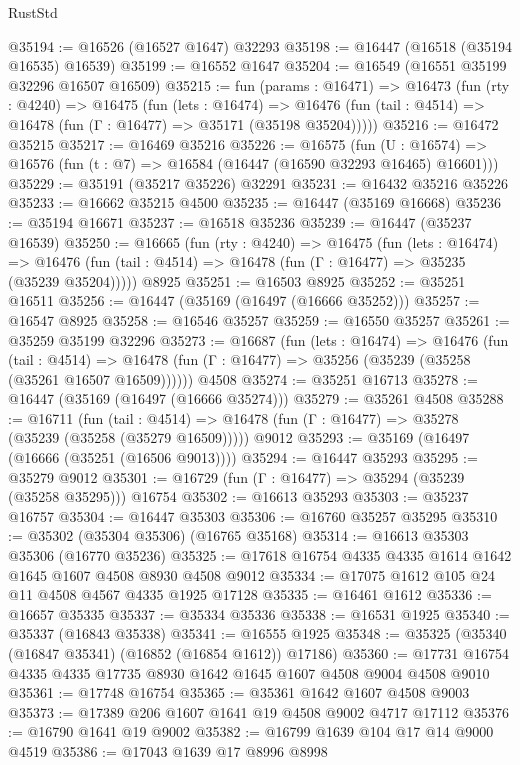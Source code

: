 \begin{lexlean}{RustStd}
\begin{coremodule}
@35194 := @16526 (@16527 @1647) @32293
@35198 := @16447 (@16518 (@35194 @16535) @16539)
@35199 := @16552 @1647
@35204 := @16549 (@16551 @35199 @32296 @16507 @16509)
@35215 := fun (params : @16471) =>
  @16473
    (fun (rty : @4240) =>
    @16475
      (fun (lets : @16474) =>
      @16476 (fun (tail : @4514) => @16478 (fun (Γ : @16477) => @35171 (@35198 @35204)))))
@35216 := @16472 @35215
@35217 := @16469 @35216
@35226 := @16575
    (fun (U : @16574) => @16576 (fun (t : @7) => @16584 (@16447 (@16590 @32293 @16465) @16601)))
@35229 := @35191 (@35217 @35226) @32291
@35231 := @16432 @35216 @35226
@35233 := @16662 @35215 @4500
@35235 := @16447 (@35169 @16668)
@35236 := @35194 @16671
@35237 := @16518 @35236
@35239 := @16447 (@35237 @16539)
@35250 := @16665
    (fun (rty : @4240) =>
    @16475
      (fun (lets : @16474) =>
      @16476 (fun (tail : @4514) => @16478 (fun (Γ : @16477) => @35235 (@35239 @35204)))))
    @8925
@35251 := @16503 @8925
@35252 := @35251 @16511
@35256 := @16447 (@35169 (@16497 (@16666 @35252)))
@35257 := @16547 @8925
@35258 := @16546 @35257
@35259 := @16550 @35257
@35261 := @35259 @35199 @32296
@35273 := @16687
    (fun (lets : @16474) =>
    @16476
      (fun (tail : @4514) =>
      @16478 (fun (Γ : @16477) => @35256 (@35239 (@35258 (@35261 @16507 @16509))))))
    @4508
@35274 := @35251 @16713
@35278 := @16447 (@35169 (@16497 (@16666 @35274)))
@35279 := @35261 @4508
@35288 := @16711
    (fun (tail : @4514) => @16478 (fun (Γ : @16477) => @35278 (@35239 (@35258 (@35279 @16509)))))
    @9012
@35293 := @35169 (@16497 (@16666 (@35251 (@16506 @9013))))
@35294 := @16447 @35293
@35295 := @35279 @9012
@35301 := @16729 (fun (Γ : @16477) => @35294 (@35239 (@35258 @35295))) @16754
@35302 := @16613 @35293
@35303 := @35237 @16757
@35304 := @16447 @35303
@35306 := @16760 @35257 @35295
@35310 := @35302 (@35304 @35306) (@16765 @35168)
@35314 := @16613 @35303 @35306 (@16770 @35236)
@35325 := @17618 @16754 @4335 @4335 @1614 @1642 @1645 @1607 @4508 @8930 @4508 @9012
@35334 := @17075 @1612 @105 @24 @11 @4508 @4567 @4335 @1925 @17128
@35335 := @16461 @1612
@35336 := @16657 @35335
@35337 := @35334 @35336
@35338 := @16531 @1925
@35340 := @35337 (@16843 @35338)
@35341 := @16555 @1925
@35348 := @35325 (@35340 (@16847 @35341) (@16852 (@16854 @1612)) @17186)
@35360 := @17731 @16754 @4335 @4335 @17735 @8930 @1642 @1645 @1607 @4508 @9004 @4508 @9010
@35361 := @17748 @16754
@35365 := @35361 @1642 @1607 @4508 @9003
@35373 := @17389 @206 @1607 @1641 @19 @4508 @9002 @4717 @17112
@35376 := @16790 @1641 @19 @9002
@35382 := @16799 @1639 @104 @17 @14 @9000 @4519
@35386 := @17043 @1639 @17 @8996 @8998

\end{coremodule}
\end{lexlean}
